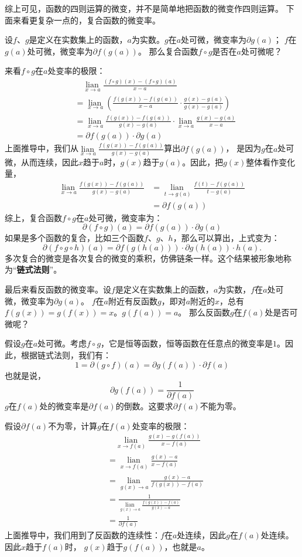 \documentclass[12pt,UTF8]{ctexbook}
\newcommand{\lian}[1]{
    \underset{#1}{\operatorname{lian}\,}
}
\theoremstyle{definition}
\theoremstyle{plain}
\begin{document}
综上可见，函数的四则运算的微变，并不是简单地把函数的微变作四则运算。
下面来看更复杂一点的，复合函数的微变率。

设$f$、$g$是定义在实数集上的函数，$a$为实数。$g$在$a$处可微，微变率为$\partial g(a)$；
$f$在$g(a)$处可微，微变率为$\partial f(g(a))$。
那么复合函数$f\circ g$是否在$a$处可微呢？

来看$f\circ g$在$a$处变率的极限：
\begin{align*}
    & \quad \lian{x\to a} \frac{(f \circ g)(x) - (f \circ g)(a)}{x - a}  \\
    &= \lian{x\to a} \left(\frac{f(g(x)) - f(g(a))}{x - a} \cdot \frac{g(x) - g(a)}{g(x) - g(a)}\right)  \\
    &= \lian{x\to a} \frac{f(g(x)) - f(g(a))}{g(x) - g(a)} \cdot \lian{x\to a} \frac{g(x) - g(a)}{x - a}  \\
    &= \partial f(g(a)) \cdot \partial g(a)  
\end{align*}
上面推导中，我们从$\lian{x\to a} \frac{f(g(x)) - f(g(a))}{g(x) - g(a)}$算出$\partial f(g(a))$，
是因为$g$在$a$处可微，从而连续，因此$x$趋于$a$时，$g(x)$趋于$g(a)$。因此，把$g(x)$整体看作变化量，
\begin{align*}
    \lian{x\to a} \frac{f(g(x)) - f(g(a))}{g(x) - g(a)} &= \lian{t\to g(a)} \frac{f(t) - f(g(a))}{t - g(a)}  \\
    &= \partial f(g(a))  
\end{align*}
综上，复合函数$f\circ g$在$a$处可微，微变率为：
$$ \partial (f\circ g) (a) = \partial f(g(a)) \cdot \partial g(a)$$
如果是多个函数的复合，比如三个函数$f$、$g$、$h$，那么可以算出，上式变为：
$$ \partial (f\circ g \circ h) (a) = \partial f(g(h(a))) \cdot \partial g(h(a)) \cdot h(a).$$
多次复合的微变是各次复合的微变的乘积，仿佛链条一样。这个结果被形象地称为“\textbf{链式法则}”。

最后来看反函数的微变率。设$f$是定义在实数集上的函数，$a$为实数，$f$在$a$处可微，微变率为$\partial g(a)$。
$f$在$a$附近有反函数$g$，即对$a$附近的$x$，总有$f(g(x)) = g(f(x)) = x$。$g(f(a)) = a$。
那么反函数$g$在$f(a)$处是否可微呢？

假设$g$在$a$处可微。考虑$f\circ g$，它是恒等函数，恒等函数在任意点的微变率是$1$。因此，根据链式法则，我们有：
$$ 1 = \partial (g\circ f) (a) = \partial g(f(a)) \cdot \partial f(a)$$
也就是说，
$$ \partial g(f(a)) = \frac{1}{\partial f(a)} $$
$g$在$f(a)$处的微变率是$\partial f(a)$的倒数。这要求$\partial f(a)$不能为零。

假设$\partial f(a)$不为零，计算$g$在$f(a)$处变率的极限：
\begin{align*}
    & \quad \lian{x\to f(a)} \frac{g(x) - g(f(a))}{x - f(a)}  \\
    &= \lian{x\to f(a)} \frac{g(x) - a}{x - f(a)}  \\
    &= \lian{g(x)\to a} \frac{g(x) - a}{f(g(x)) - f(a)}  \\
    &= \frac{1}{\lian{g(x)\to a}\frac{f(g(x)) - f(a)}{g(x) - a}}  \\
    &= \frac{1}{\partial f(a)} 
\end{align*}
上面推导中，我们用到了反函数的连续性：$f$在$a$处连续，因此$g$在$f(a)$处连续。因此$x$趋于$f(a)$时，
$g(x)$趋于$g(f(a))$，也就是$a$。
\end{document}
